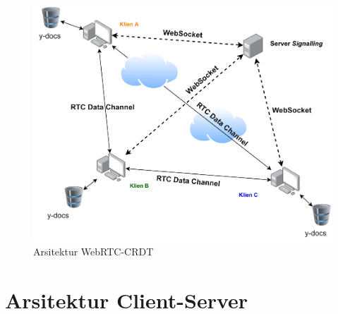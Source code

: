 \begin{figure}
    \centering
    \includegraphics[scale=0.6]{assets/skripsi/Arsitektur_WebRTC_CRDT}
    \caption{Arsitektur WebRTC-CRDT}
\end{figure}

\section{Arsitektur Client-Server}

